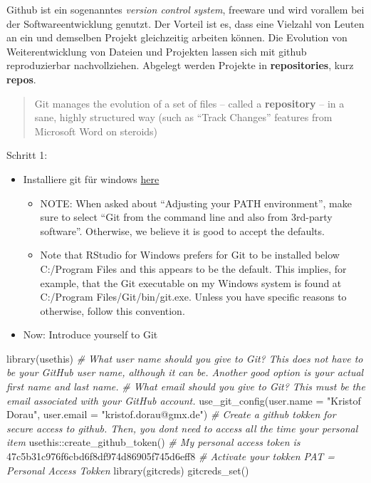 \documentclass[
]{article}
\newenvironment{Shaded}{\begin{snugshade}}{\end{snugshade}}
\newcommand{\AttributeTok}[1]{\textcolor[rgb]{0.77,0.63,0.00}{#1}}
\newcommand{\CommentTok}[1]{\textcolor[rgb]{0.56,0.35,0.01}{\textit{#1}}}
\newcommand{\FunctionTok}[1]{\textcolor[rgb]{0.00,0.00,0.00}{#1}}
\newcommand{\NormalTok}[1]{#1}
\newcommand{\SpecialCharTok}[1]{\textcolor[rgb]{0.00,0.00,0.00}{#1}}
\newcommand{\StringTok}[1]{\textcolor[rgb]{0.31,0.60,0.02}{#1}}
\providecommand{\tightlist}{%
  \setlength{\itemsep}{0pt}\setlength{\parskip}{0pt}}
\begin{document}
Github ist ein sogenanntes \emph{version control system}, freeware und wird vorallem bei der Softwareentwicklung genutzt. Der Vorteil ist es, dass eine Vielzahl von Leuten an ein und demselben Projekt gleichzeitig arbeiten können. Die Evolution von Weiterentwicklung von Dateien und Projekten lassen sich mit github reproduzierbar nachvollziehen. Abgelegt werden Projekte in \textbf{repositories}, kurz \textbf{repos}.

\begin{quote}
Git manages the evolution of a set of files -- called a \textbf{repository} -- in a sane, highly structured way (such as ``Track Changes'' features from Microsoft Word on steroids)
\end{quote}

Schritt 1:

\begin{itemize}
\tightlist
\item
  Installiere git für windows \href{https://gitforwindows.org/}{here}

  \begin{itemize}
  \tightlist
  \item
    NOTE: When asked about ``Adjusting your PATH environment'', make
    sure to select ``Git from the command line and also from
    3rd-party software''. Otherwise, we believe it is good to accept
    the defaults.
  \item
    Note that RStudio for Windows prefers for Git to be installed
    below C:/Program Files and this appears to be the default. This
    implies, for example, that the Git executable on my Windows
    system is found at C:/Program Files/Git/bin/git.exe. Unless you
    have specific reasons to otherwise, follow this convention.
  \end{itemize}
\item
  Now: Introduce yourself to Git
\end{itemize}

\begin{Shaded}
\begin{Highlighting}[]
\FunctionTok{library}\NormalTok{(usethis)}
\CommentTok{\# What user name should you give to Git? This does not have to be your GitHub user name, although it can be. Another good option is your actual first name and last name.}
\CommentTok{\# What email should you give to Git? This must be the email associated with your GitHub account.}
\FunctionTok{use\_git\_config}\NormalTok{(}\AttributeTok{user.name =} \StringTok{"Kristof Dorau"}\NormalTok{, }\AttributeTok{user.email =} \StringTok{"kristof.dorau@gmx.de"}\NormalTok{)}
\CommentTok{\# Create a github tokken for secure access to github. Then, you don\textquotesingle{}t need to access all the time your personal item}
\NormalTok{usethis}\SpecialCharTok{::}\FunctionTok{create\_github\_token}\NormalTok{()}
\CommentTok{\# My personal access token is}
\NormalTok{47c5b31c976f6cbd6f8df974d86905f745d6eff8 }
\CommentTok{\# Activate your tokken PAT = Personal Access Tokken}
\FunctionTok{library}\NormalTok{(gitcreds)}
\FunctionTok{gitcreds\_set}\NormalTok{()}
\end{Highlighting}
\end{Shaded}
\end{document}

